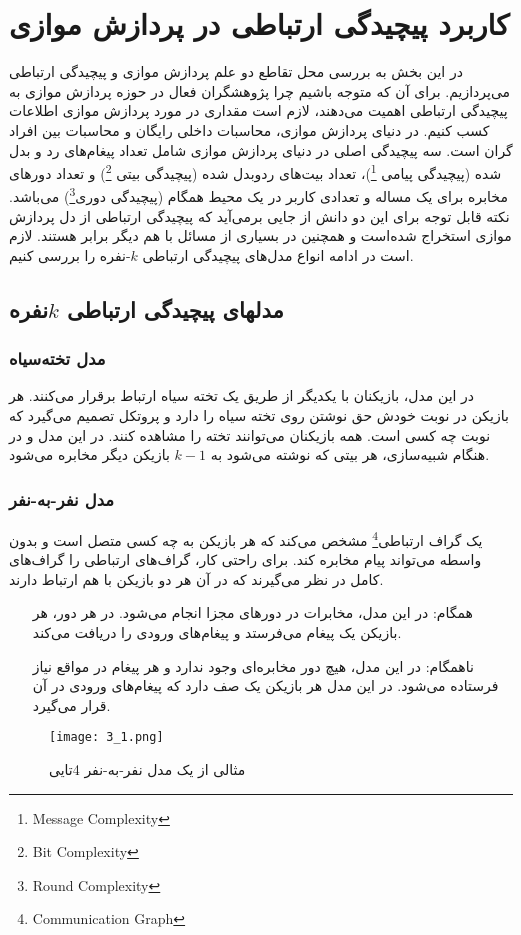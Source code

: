 \chapter{کاربرد پیچیدگی ارتباطی در پردازش موازی }\label{chapter3}

در این بخش به بررسی محل تقاطع دو علم پردازش موازی و پیچیدگی ارتباطی می‌پردازیم. برای آن که متوجه باشیم چرا پژوهشگران فعال در حوزه پردازش موازی به پیچیدگی ارتباطی اهمیت می‌دهند، لازم است مقداری در مورد پردازش موازی اطلاعات کسب کنیم. در دنیای پردازش موازی، محاسبات داخلی رایگان و محاسبات بین افراد گران است. سه پیچیدگی اصلی در دنیای پردازش موازی شامل تعداد پیغام‌های رد و بدل شده (پیچیدگی پیامی \footnote{Message Complexity})، تعداد بیت‌های ردوبدل شده (پیچیدگی بیتی \footnote{Bit Complexity}) و تعداد دورهای مخابره برای یک مساله و تعدادی کاربر در یک محیط همگام (پیچیدگی دوری\footnote{Round Complexity}) می‌باشد. نکته قابل توجه برای این دو دانش از جایی برمی‌آید که پیچیدگی ارتباطی از دل پردازش موازی استخراج شده‌است و همچنین در بسیاری از مسائل با هم دیگر برابر هستند. لازم است در ادامه انواع مدل‌های پیچیدگی ارتباطی $k$-نفره را بررسی کنیم. 
\section{مدلهای پیچیدگی ارتباطی $k$نفره}

\subsection{مدل تخته‌سیاه}

در این مدل، بازیکنان با یکدیگر از طریق یک تخته سیاه ارتباط برقرار می‌کنند. هر بازیکن در نوبت خودش حق نوشتن روی تخته سیاه را دارد و پروتکل تصمیم می‌گیرد که نوبت چه کسی است. همه بازیکنان می‌توانند تخته را مشاهده کنند. در این مدل و در هنگام شبیه‌سازی، هر بیتی که نوشته می‌شود به $k-1$ بازیکن دیگر مخابره می‌شود. 

\subsection{مدل نفر-به-نفر}
یک گراف ارتباطی\footnote{Communication Graph} مشخص می‌کند که هر بازیکن به چه کسی متصل است و بدون واسطه می‌تواند پیام مخابره کند. برای راحتی کار، گراف‌های ارتباطی را گراف‌های کامل در نظر می‌گیرند که در آن هر دو بازیکن با هم ارتباط دارند. 
\begin{itemize}
	\item [همگام:] در این مدل، مخابرات در دورهای مجزا انجام می‌شو‌د. در هر دور، هر بازیکن یک پیغام می‌فرستد و پیغام‌های ورودی را دریافت می‌کند. 
	\item [ناهمگام:] در این مدل، هیچ دور مخابره‌ای وجود ندارد و هر پیغام در مواقع نیاز فرستاده می‌شود. در این مدل هر بازیکن یک صف دارد که پیغام‌ها‌ی ورودی در آن قرار می‌گیرد.
\end{itemize}
\begin{figure}[h]
	\caption{مثالی از یک مدل نفر-به-نفر 4تایی}
	\centering
	\texttt{[image: 3\_1.png]}
\end{figure}
